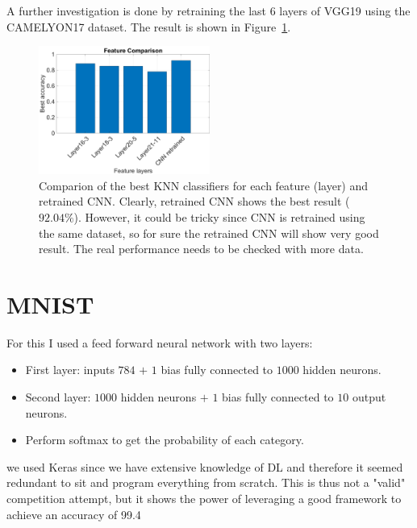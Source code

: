 \documentclass[a4paper]{article}
\begin{document}
A further investigation is done by retraining the last $6$ layers of VGG19 using the CAMELYON17 dataset. The result is shown in Figure~\ref{figknn3}.
	\begin{figure}[ht]
	\centering
	\includegraphics[width=0.5\textwidth]{figures/ex5_3.png}
	\caption{Comparion of the best KNN classifiers for each feature (layer) and retrained CNN. Clearly, retrained CNN shows the best result ($92.04\%$). However, it could be tricky since CNN is retrained using the same dataset, so for sure the retrained CNN will show very good result. The real performance needs to be checked with more data.}
	\label{figknn3}
\end{figure}

\section{MNIST}
For this I used a feed forward neural network with two layers:
\begin{itemize}
	\item First layer: inputs $784$ $+$ $1$ bias fully connected to $1000$ hidden neurons.
	\item Second layer: $1000$ hidden neurons $+$ $1$ bias fully connected to $10$ output neurons.
	\item Perform softmax to get the probability of each category.
\end{itemize}



we used Keras since we have extensive knowledge of DL and therefore it seemed redundant to sit
and program everything from scratch. This is thus not a "valid" competition attempt, but it shows the power
of leveraging a good framework to achieve an accuracy of 99.4%



	
	
	
\end{document}
